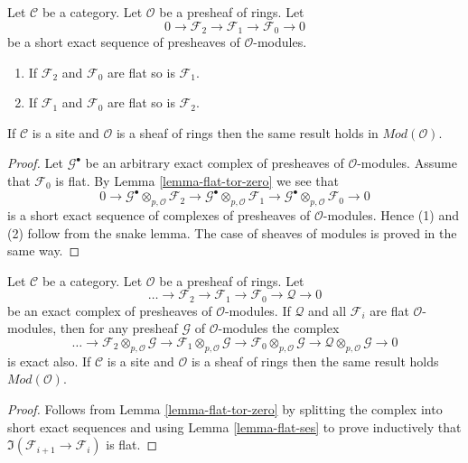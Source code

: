 \begin{lemma}
\label{lemma-flat-ses}
Let $\mathcal{C}$ be a category.
Let $\mathcal{O}$ be a presheaf of rings.
Let
$$
0 \to
\mathcal{F}_2 \to
\mathcal{F}_1 \to
\mathcal{F}_0 \to 0
$$
be a short exact sequence of presheaves of $\mathcal{O}$-modules.
\begin{enumerate}
\item If $\mathcal{F}_2$ and $\mathcal{F}_0$ are flat so is
$\mathcal{F}_1$.
\item If $\mathcal{F}_1$ and $\mathcal{F}_0$ are flat so is
$\mathcal{F}_2$.
\end{enumerate}
If $\mathcal{C}$ is a site and $\mathcal{O}$ is a
sheaf of rings then the same result holds in $\textit{Mod}(\mathcal{O})$.
\end{lemma}

\begin{proof}
Let $\mathcal{G}^\bullet$ be an arbitrary exact complex of presheaves
of $\mathcal{O}$-modules. Assume that $\mathcal{F}_0$ is flat.
By Lemma \ref{lemma-flat-tor-zero} we see that
$$
0 \to
\mathcal{G}^\bullet \otimes_{p, \mathcal{O}} \mathcal{F}_2 \to
\mathcal{G}^\bullet \otimes_{p, \mathcal{O}} \mathcal{F}_1 \to
\mathcal{G}^\bullet \otimes_{p, \mathcal{O}} \mathcal{F}_0 \to 0
$$
is a short exact sequence of complexes of presheaves of
$\mathcal{O}$-modules. Hence (1) and (2) follow from the snake lemma.
The case of sheaves of modules is proved in the same way.
\end{proof}

\begin{lemma}
\label{lemma-flat-resolution-of-flat}
Let $\mathcal{C}$ be a category.
Let $\mathcal{O}$ be a presheaf of rings.
Let
$$
\ldots \to
\mathcal{F}_2 \to
\mathcal{F}_1 \to
\mathcal{F}_0 \to
\mathcal{Q} \to 0
$$
be an exact complex of presheaves of $\mathcal{O}$-modules.
If $\mathcal{Q}$ and all $\mathcal{F}_i$ are flat $\mathcal{O}$-modules,
then for any presheaf $\mathcal{G}$ of $\mathcal{O}$-modules the
complex
$$
\ldots \to
\mathcal{F}_2 \otimes_{p, \mathcal{O}} \mathcal{G} \to
\mathcal{F}_1 \otimes_{p, \mathcal{O}} \mathcal{G} \to
\mathcal{F}_0 \otimes_{p, \mathcal{O}} \mathcal{G} \to
\mathcal{Q} \otimes_{p, \mathcal{O}} \mathcal{G} \to 0
$$
is exact also. If $\mathcal{C}$ is a site and $\mathcal{O}$ is a
sheaf of rings then the same result holds $\textit{Mod}(\mathcal{O})$.
\end{lemma}

\begin{proof}
Follows from Lemma \ref{lemma-flat-tor-zero} by splitting the complex
into short exact sequences and using Lemma \ref{lemma-flat-ses} to
prove inductively that $\Im(\mathcal{F}_{i + 1} \to \mathcal{F}_i)$
is flat.
\end{proof}

